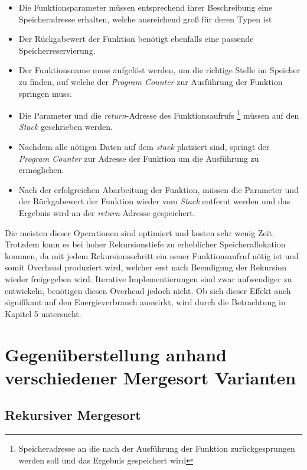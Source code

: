 \begin{itemize}
\item Die Funktionsparameter müssen entsprechend ihrer Beschreibung eine Speicheradresse  erhalten, welche ausreichend groß für deren Typen ist

\item Der Rückgabewert der Funktion benötigt ebenfalls eine passende Speicherreservierung.
\item Der Funktionsname muss aufgelöst werden, um die richtige Stelle im Speicher zu finden, auf welche der \emph{Program Counter} zur Ausführung der Funktion springen muss.
\item Die Parameter und die \emph{return}-Adresse des Funktionsaufrufs \footnote{Speicheradresse an die nach der Ausführung der Funktion zurückgesprungen werden soll und das Ergebnis gespeichert wird} müssen auf den \emph{Stack} geschrieben werden.
\item Nachdem alle nötigen Daten auf dem \emph{stack} platziert sind, springt der \emph{Program Counter} zur Adresse der Funktion um die Ausführung zu ermöglichen.
\item Nach der erfolgreichen Abarbeitung der Funktion, müssen die Parameter und der Rückgabewert der Funktion wieder vom \emph{Stack} entfernt werden und das Ergebnis wird an der \emph{return}-Adresse gespeichert. 
\end{itemize}

Die meisten dieser Operationen sind optimiert und kosten sehr wenig Zeit. Trotzdem kann es bei hoher Rekursionstiefe zu erheblicher Speicherallokation kommen, da mit jedem Rekursionsschritt ein neuer Funktionsaufruf nötig ist und somit Overhead produziert wird, welcher erst nach Beendigung der Rekursion wieder freigegeben wird. Iterative Implementierungen sind zwar aufwendiger zu entwickeln, benötigen diesen Overhead jedoch nicht. Ob sich dieser Effekt auch signifikant auf den Energieverbrauch auswirkt, wird durch die Betrachtung in Kapitel 5 untersucht.

\section{Gegenüberstellung anhand verschiedener Mergesort Varianten}
\subsection{Rekursiver Mergesort}

